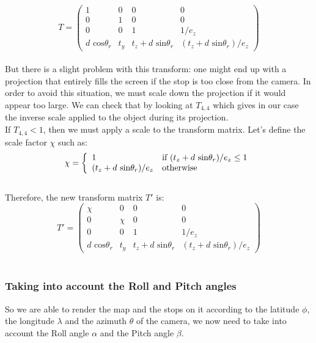 \[ T = \left( \begin{array}{cccc}
	1					& 0 					& 0 						& 0\\
	0 					& 1					& 0 						& 0\\
	0					& 0					& 1						& 1/e_z\\
	d \textrm{ cos}\theta_r	& t_y					& t_z + d \textrm{ sin}\theta_r	& (t_z + d \textrm{ sin}\theta_r) / e_z
\end{array} \right)\]\\

But there is a slight problem with this transform: one might end up with a projection that entirely fills the screen if the stop is too close from the camera. In order to avoid this situation, we must scale down the projection if it would appear too large. We can check that by looking at $T_{4, 4}$ which gives in our case the inverse scale applied to the object during its projection.\\

If $T_{4, 4} < 1$, then we must apply a scale to the transform matrix. Let's define the scale factor $\chi$ such as:\\

\[\chi = 
\left\{
\begin{array}{l l}
1 & \textrm{if } (t_z + d \textrm{ sin}\theta_r) / e_z \leq 1\\
 (t_z + d \textrm{ sin}\theta_r) / e_z & \textrm{otherwise}
\end{array}
\right.
\]\\

Therefore, the new transform matrix $T'$ is:\\

\[ T' = \left( \begin{array}{cccc}
	\chi					& 0 					& 0 						& 0\\
	0 					& \chi				& 0 						& 0\\
	0					& 0					& 1						& 1/e_z\\
	d \textrm{ cos}\theta_r	& t_y					& t_z + d \textrm{ sin}\theta_r	& (t_z + d \textrm{ sin}\theta_r) / e_z
\end{array} \right)\]\\

\subsubsection{Taking into account the Roll and Pitch angles}

So we are able to render the map and the stops on it according to the latitude $\phi$, the longitude $\lambda$ and the azimuth $\theta$ of the camera, we now need to take into account the Roll angle $\alpha$ and the Pitch angle $\beta$.\\

